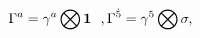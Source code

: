 \begin{equation}
\Gamma^a = \gamma^a \bigotimes {\bf 1}~~, \Gamma^{{\dot 5}} =
\gamma^5 \bigotimes {\bf \sigma},
\end{equation}

